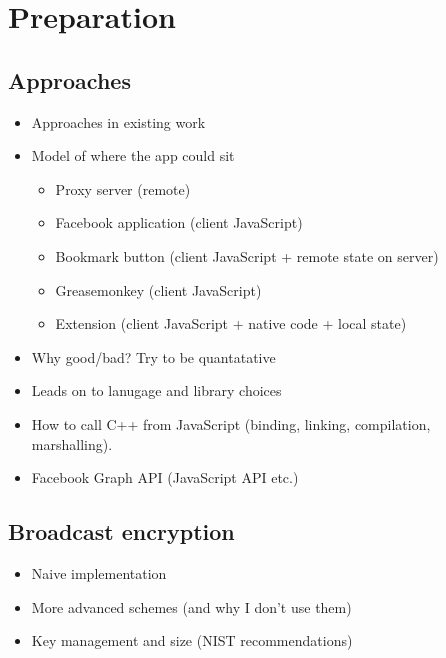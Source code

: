 \chapter{Preparation}\label{ch:preparation}

\section{Approaches}
    \begin{itemize}
	\item Approaches in existing work
        
	\item Model of where the app could sit
        \begin{itemize}
                \item Proxy server (remote)
        
                \item Facebook application (client JavaScript)
        
		\item Bookmark button (client JavaScript + remote state on server)
                
		\item Greasemonkey (client JavaScript)
                
		\item Extension (client JavaScript + native code + local state)
        \end{itemize}
        
	\item Why good/bad? Try to be quantatative
        
	\item Leads on to lanugage and library choices
        
	\item How to call C++ from JavaScript (binding, linking, compilation, marshalling).
                
	\item Facebook Graph API (JavaScript API etc.)
    \end{itemize}

\section{Broadcast encryption}
    \begin{itemize}
	\item Naive implementation
	\item More advanced schemes (and why I don't use them)
	\item Key management and size (NIST recommendations)
    \end{itemize}
    

